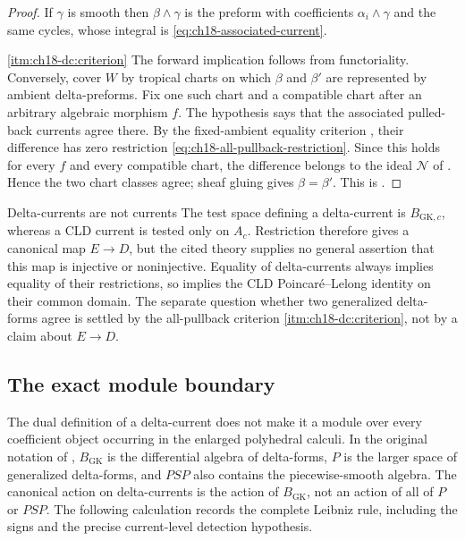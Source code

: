 \begin{proof}
If $\gamma$ is smooth then
$\beta\wedge\gamma$ is the preform with coefficients $\alpha_i\wedge\gamma$
and the same cycles, whose integral is \eqref{eq:ch18-associated-current}.

\cref{itm:ch18-dc:criterion} The forward implication follows from
functoriality.  Conversely, cover $W$ by tropical charts on which $\beta$
and $\beta'$ are represented by ambient delta-preforms.  Fix one such chart
and a compatible chart after an arbitrary algebraic morphism $f$.  The
hypothesis says that the associated pulled-back currents agree there.  By
the fixed-ambient equality criterion
, their difference has zero restriction
\eqref{eq:ch18-all-pullback-restriction}.  Since this holds for every $f$ and
every compatible chart, the difference belongs to the ideal
$\mathcal N$ of .  Hence the two chart classes
agree; sheaf gluing gives $\beta=\beta'$.  This is
\cite[Proposition~6.8]{GK17}.
\end{proof}

\noindent\begin{minipage}{\textwidth}
\begin{warning}{Delta-currents are not currents}
The test space defining a delta-current is $B_{\mathrm{GK},c}$, whereas a
CLD current is tested only on $A_c$.  Restriction therefore gives a
canonical map $E\to D$, but the cited theory supplies no general assertion
that this map is injective or noninjective.  Equality of delta-currents
always implies equality of their restrictions, so
 implies the CLD Poincar\'e--Lelong identity on
their common domain.  The separate question whether two generalized
delta-forms agree is settled by the all-pullback criterion
\cref{itm:ch18-dc:criterion}, not by a claim about $E\to D$.
\end{warning}
\end{minipage}\par

\subsection{The exact module boundary}
\label{sec:ch18-delta-current-module}

The dual definition of a delta-current does not make it a module over every
coefficient object occurring in the enlarged polyhedral calculi.  In the
original notation of \cite{GK17}, $B_{\mathrm{GK}}$ is the differential
algebra of delta-forms, $P$ is the larger space of generalized
delta-forms, and $P\!S\!P$ also contains the piecewise-smooth algebra.
The canonical action on delta-currents is the action of
$B_{\mathrm{GK}}$, not an action of all of $P$ or $P\!S\!P$.  The
following calculation records the complete Leibniz rule, including the
signs and the precise current-level detection hypothesis.


